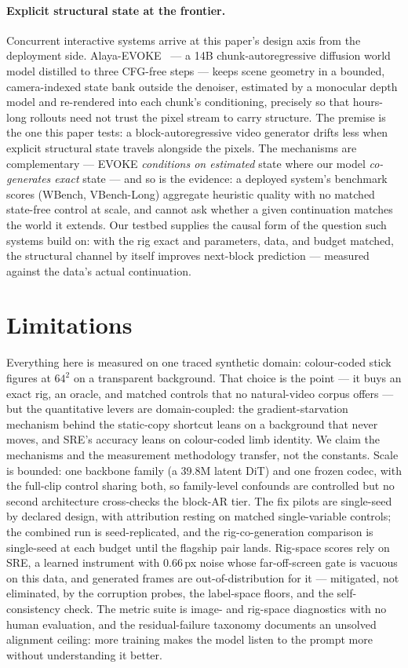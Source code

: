 \documentclass[10pt,twocolumn]{article}
\begin{document}
\paragraph{Explicit structural state at the frontier.} Concurrent interactive systems arrive at this paper's design
axis from the deployment side. Alaya-EVOKE~\cite{yin2026evoke} — a 14B chunk-autoregressive diffusion world model
distilled to three CFG-free steps — keeps scene geometry in a bounded, camera-indexed state bank outside the
denoiser, estimated by a monocular depth model and re-rendered into each chunk's conditioning, precisely so that
hours-long rollouts need not trust the pixel stream to carry structure. The premise is the one this paper tests:
a block-autoregressive video generator drifts less when explicit structural state travels alongside the pixels. The
mechanisms are complementary — EVOKE \emph{conditions on estimated} state where our model \emph{co-generates exact}
state — and so is the evidence: a deployed system's benchmark scores (WBench, VBench-Long) aggregate heuristic
quality with no matched state-free control at scale, and cannot ask whether a given continuation matches the world
it extends. Our testbed supplies the causal form of the question such systems build on: with the rig exact and
parameters, data, and budget matched, the structural channel by itself improves next-block prediction — measured
against the data's actual continuation.

\section{Limitations}
Everything here is measured on one traced synthetic domain: colour-coded stick figures at $64^2$ on a transparent
background. That choice is the point — it buys an exact rig, an oracle, and matched controls that no natural-video
corpus offers — but the quantitative levers are domain-coupled: the gradient-starvation mechanism behind the
static-copy shortcut leans on a background that never moves, and SRE's accuracy leans on colour-coded limb identity.
We claim the mechanisms and the measurement methodology transfer, not the constants. Scale is bounded: one backbone
family (a 39.8M latent DiT) and one frozen codec, with the full-clip control sharing both, so family-level
confounds are controlled but no second architecture cross-checks the block-AR tier. The fix pilots are
single-seed by declared design, with attribution resting on matched single-variable controls; the combined run is
seed-replicated, and the rig-co-generation comparison is single-seed at each budget until the flagship pair lands.
Rig-space scores rely on SRE, a learned instrument with $0.66$\,px noise whose far-off-screen gate is vacuous on
this data, and generated frames are out-of-distribution for it — mitigated, not eliminated, by the corruption
probes, the label-space floors, and the self-consistency check. The metric suite is image- and rig-space
diagnostics with no human evaluation, and the residual-failure taxonomy documents an unsolved alignment ceiling:
more training makes the model listen to the prompt more without understanding it better.
\end{document}
